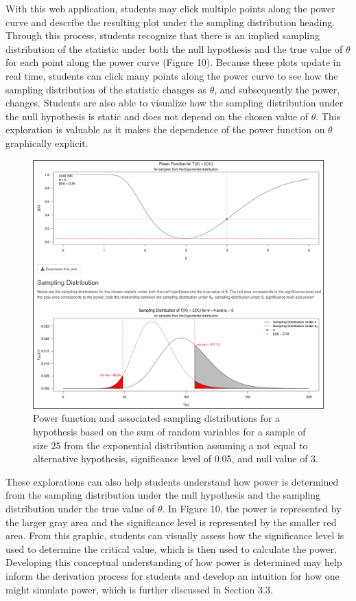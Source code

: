 \documentclass{TISE}
\begin{document}
With this web application, students may click multiple points along the power curve and describe the resulting plot under the sampling distribution heading. Through this process, students recognize that there is an implied sampling distribution of the statistic under both the null hypothesis and the true value of $\theta$ for each point along the power curve (Figure 10). Because these plots update in real time, students can click many points along the power curve to see how the sampling distribution of the statistic changes as $\theta$, and subsequently the power, changes. Students are also able to visualize how the sampling distribution under the null hypothesis is static and does not depend on the chosen value of $\theta$. This exploration is valuable as it makes the dependence of the power function on $\theta$ graphically explicit.

\begin{figure}[H]
	\centering
	\includegraphics[scale=1]{fig10.png}
	\caption{Power function and associated sampling distributions for a hypothesis based on the sum of random variables for a sample of size 25 from the exponential distribution assuming a not equal to alternative hypothesis, significance level of 0.05, and null value of 3.}
\end{figure}

These explorations can also help students understand how power is determined from the sampling distribution under the null hypothesis and the sampling distribution under the true value of $\theta$. In Figure 10, the power is represented by the larger gray area and the significance level is represented by the smaller red area. From this graphic, students can visually assess how the significance level is used to determine the critical value, which is then used to calculate the power. Developing this conceptual understanding of how power is determined may help inform the derivation process for students and develop an intuition for how one might simulate power, which is further discussed in Section 3.3.
\end{document}
